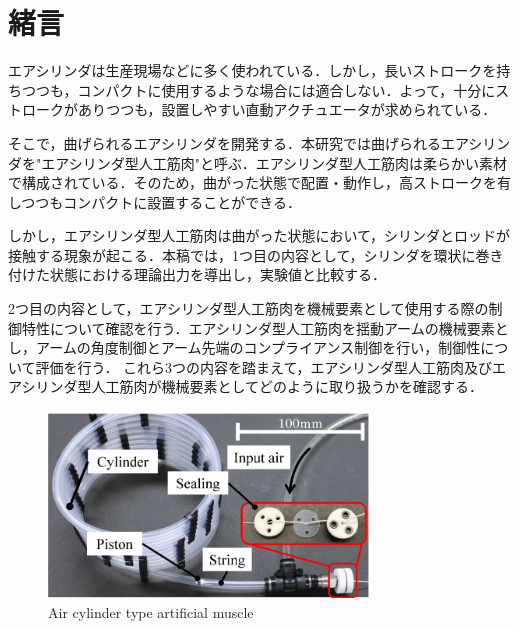 \section{緒言}%
エアシリンダは生産現場などに多く使われている．しかし，長いストロークを持ちつつも，コンパクトに使用するような場合には適合しない．よって，十分にストロークがありつつも，設置しやすい直動アクチュエータが求められている．
\par
そこで，曲げられるエアシリンダを開発する．本研究では曲げられるエアシリンダを"エアシリンダ型人工筋肉"と呼ぶ．エアシリンダ型人工筋肉は柔らかい素材で構成されている．そのため，曲がった状態で配置・動作し，高ストロークを有しつつもコンパクトに設置することができる．

しかし，エアシリンダ型人工筋肉は曲がった状態において，シリンダとロッドが接触する現象が起こる．本稿では，1つ目の内容として，シリンダを環状に巻き付けた状態における理論出力を導出し，実験値と比較する．
\par
2つ目の内容として，エアシリンダ型人工筋肉を機械要素として使用する際の制御特性について確認を行う．エアシリンダ型人工筋肉を揺動アームの機械要素とし，アームの角度制御とアーム先端のコンプライアンス制御を行い，制御性について評価を行う．
これら3つの内容を踏まえて，エアシリンダ型人工筋肉及びエアシリンダ型人工筋肉が機械要素としてどのように取り扱うかを確認する．


\begin{figure}[t]
  \centering
  \includegraphics[width=85mm]{_pdf/細径柔軟エアシリンダ-１本.pdf}
  \caption{Air cylinder type artificial muscle}
  \label{Air cylinder type artificial muscle}
\end{figure}

